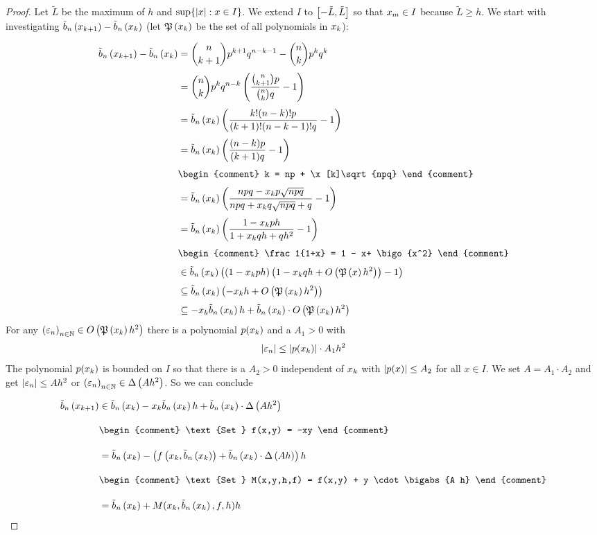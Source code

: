 \begin{proof}
  \newcommand*{\Lt}{\tilde L}

  Let $\Lt$ be the maximum of $h$ and $\sup\{\abs{x}: x \in I\}$. We extend $I$ to $\interval{-\Lt}{\Lt}$ so that $\xnp \in I$ because $\Lt \ge h$. We start with investigating $\bb{\x[k+1]}-\bb{\x[k]}$ (let $\pol{\x}$ be the set of all polynomials in $\x$):

  \begin{align}
    \bb{\x[k+1]} - \bb{\x[k]} &= \binom n{k+1} p^{k+1}q^{n-k-1} - \binom nk p^k q^k \nl
    &= \binom nk p^k q^{n-k} \br{\frac{\binom n{k+1}p}{\binom nk q} -1} \nl
    &= \bb{\x[k]} \br{\frac{k! (n-k)! p}{(k+1)!(n-k-1)! q} -1} \nl
    &= \bb{\x[k]} \br{\frac{(n-k)p}{(k+1)q}-1} \nl
    &
    \begin{comment}
      k = np + \x[k]\sqrt{npq}
    \end{comment} \nl
    &= \bb{\x[k]} \br{\frac{npq-\x[k]p\sqrt{npq}}{npq + \x[k]q\sqrt{npq}+q}-1} \nl
    &= \bb{\x[k]} \br{\frac{1-\x[k]ph}{1+\x[k]qh+qh^2}-1} \nl
    &
    \begin{comment}
      \frac1{1+x} = 1 - x+ \bigo{x^2}
    \end{comment} \nl
    &\in \bb{\x[k]} \br{\br{1-\x[k]ph}\br{1-\x[k]qh + \bigo{\pol{x}h^2}}-1} \nl
    &\subseteq \bb{\x[k]} \br{-\x[k]h + \bigo{\pol{\x}h^2}} \nl
    &\subseteq -\x[k]\bb{\x}h +  \bb{\x[k]} \cdot \bigo{\pol{\x}h^2}
  \end{align}
  For any $\seq{\epsilon_n} \in \bigo{\pol{\x[k]}h^2}$ there is a polynomial $p(\x[k])$ and a $A_1 > 0$ with
  \begin{align}
    \abs{\epsilon_n} \le \abs{p(\x[k])} \cdot A_1 h^2
  \end{align}
  The polynomial $p(\x)$ is bounded on $I$ so that there is a $A_2>0$ independent of $\x$ with $\abs{p(x)} \le A_2$ for all $x\in I$. We set $A=A_1\cdot A_2$ and get $\abs{\epsilon_n} \le A h^2$ or $\seq{\epsilon_n}\in \bigabs{A h^2}$. So we can conclude

  \begin{align}
    \bb{\x[k+1]} &\in \bb{\x[k]} -\x[k]\bb{\x[k]} h + \bb{\x} \cdot \bigabs{A h^2}\bnl
    &
    \begin{comment}
      \text{Set } f(x,y) = -xy
    \end{comment} \bnl
    &= \bb{\x[k]} - \br{\f{\x[k], \bb{\x[k]}} + \bb{\x} \cdot \bigabs{A h}}h \bnl
    &
    \begin{comment}
      \text{Set } M(x,y,h,f) = f(x,y) + y \cdot \bigabs{A h}
    \end{comment} \bnl
    &= \bb{\x[k]} + M(\x[k], \bb{\x[k]}, f, h) h
  \end{align}


\end{proof}
